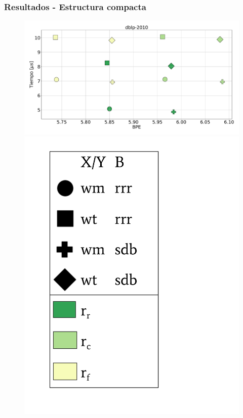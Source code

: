 \begin{frame}
\frametitle{Resultados - Estructura compacta}

\begin{figure}
	\centering
	
    	\begin{minipage}{1\textwidth}
    		\centering
    		\begin{minipage}{0.8\textwidth}
    			\centering
    			\includegraphics[width=1\linewidth]{../img/sdsl/aleatorioBig/dblp-2010.pdf}
    		\end{minipage}
    		\begin{minipage}{0.15\textwidth}
    			\centering
    			\includegraphics[scale=.15, clip, trim=70 0 0 0]{../img/sdsl/label.pdf}
    		\end{minipage}	
    	\end{minipage}


\end{figure}
\end{frame}
